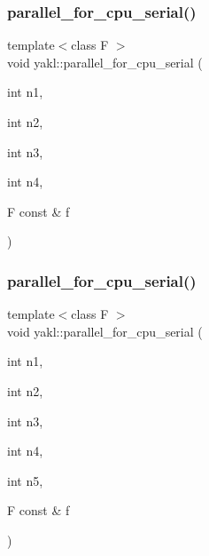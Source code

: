 \subsubsection{\texorpdfstring{parallel\+\_\+for\+\_\+cpu\+\_\+serial()}{parallel\_for\_cpu\_serial()}\hspace{0.1cm}{\footnotesize\ttfamily [4/8]}}
{\footnotesize\ttfamily template$<$class F $>$ \\
void yakl\+::parallel\+\_\+for\+\_\+cpu\+\_\+serial (\begin{DoxyParamCaption}\item[{int}]{n1,  }\item[{int}]{n2,  }\item[{int}]{n3,  }\item[{int}]{n4,  }\item[{F const \&}]{f }\end{DoxyParamCaption})\hspace{0.3cm}{\ttfamily [inline]}}

\mbox{\label{namespaceyakl_a668fe7b1f8e77dfd281e82ae9cad46ca}} 
\subsubsection{\texorpdfstring{parallel\+\_\+for\+\_\+cpu\+\_\+serial()}{parallel\_for\_cpu\_serial()}\hspace{0.1cm}{\footnotesize\ttfamily [5/8]}}
{\footnotesize\ttfamily template$<$class F $>$ \\
void yakl\+::parallel\+\_\+for\+\_\+cpu\+\_\+serial (\begin{DoxyParamCaption}\item[{int}]{n1,  }\item[{int}]{n2,  }\item[{int}]{n3,  }\item[{int}]{n4,  }\item[{int}]{n5,  }\item[{F const \&}]{f }\end{DoxyParamCaption})\hspace{0.3cm}{\ttfamily [inline]}}

\mbox{\label{namespaceyakl_a2e3777e8985e3fee7e10693611429bf7}} 
